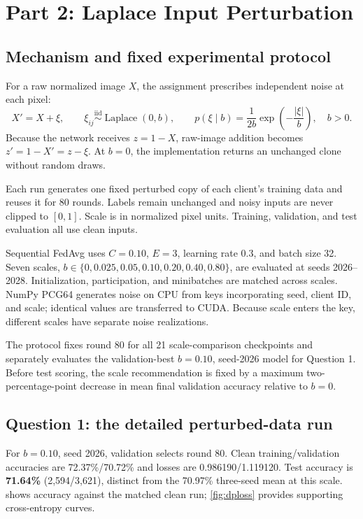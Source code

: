 \section{Part 2: Laplace Input Perturbation}\label{sec:p2}
\subsection{Mechanism and fixed experimental protocol}
For a raw normalized image $X$, the assignment prescribes independent noise at each pixel:
\begin{equation}
 X'=X+\xi,\qquad \xi_{ij}\overset{\mathrm{iid}}{\sim}\operatorname{Laplace}(0,b),
 \qquad p(\xi\mid b)=\frac{1}{2b}\exp\left(-\frac{|\xi|}{b}\right),\quad b>0.\label{eq:laplace}
\end{equation}
Because the network receives $z=1-X$, raw-image addition becomes $z'=1-X'=z-\xi$. At $b=0$, the implementation returns an unchanged clone without random draws.

Each run generates one fixed perturbed copy of each client's training data and reuses it for 80 rounds. Labels remain unchanged and noisy inputs are never clipped to $[0,1]$. Scale is in normalized pixel units. Training, validation, and test evaluation all use clean inputs.

Sequential FedAvg uses $C=0.10$, $E=3$, learning rate 0.3, and batch size 32. Seven scales, $b\in\{0,0.025,0.05,0.10,0.20,0.40,0.80\}$, are evaluated at seeds 2026--2028. Initialization, participation, and minibatches are matched across scales. NumPy PCG64 generates noise on CPU from keys incorporating seed, client ID, and scale; identical values are transferred to CUDA. Because scale enters the key, different scales have separate noise realizations.

The protocol fixes round 80 for all 21 scale-comparison checkpoints and separately evaluates the validation-best $b=0.10$, seed-2026 model for Question 1. Before test scoring, the scale recommendation is fixed by a maximum two-percentage-point decrease in mean final validation accuracy relative to $b=0$.

\subsection{Question 1: the detailed perturbed-data run}
For $b=0.10$, seed 2026, validation selects round 80. Clean training/validation accuracies are 72.37\%/70.72\% and losses are 0.986190/1.119120. Test accuracy is \textbf{71.64\%} (2,594/3,621), distinct from the 70.97\% three-seed mean at this scale.  shows accuracy against the matched clean run; \cref{fig:dploss} provides supporting cross-entropy curves.

